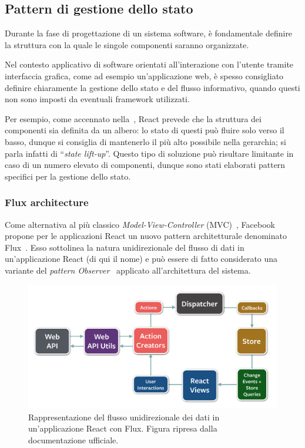 \subsection{Pattern di gestione dello stato}\label{subsec:state-manage}
Durante la fase di progettazione di un sistema software, è fondamentale definire la struttura con la quale le singole componenti saranno organizzate.

Nel contesto applicativo di software orientati all'interazione con l'utente tramite interfaccia grafica, come ad esempio un'applicazione web,
è spesso consigliato definire chiaramente la gestione dello stato e del flusso informativo, quando questi non sono imposti da eventuali framework utilizzati.

Per esempio, come accennato nella~, React prevede che la struttura dei componenti sia definita da un albero:
lo stato di questi può fluire solo verso il basso, dunque si consiglia di mantenerlo il più alto possibile nella gerarchia;
si parla infatti di ``\emph{state lift-up}''.
Questo tipo di soluzione può risultare limitante in caso di un numero elevato di componenti, dunque sono stati elaborati pattern specifici per la gestione dello stato.

\subsubsection{Flux architecture}
Come alternativa al più classico \emph{Model-View-Controller} (MVC)~\cite{Reenskaug2003TheM},
Facebook propone per le applicazioni React un nuovo pattern architetturale denominato Flux~\cite{10.1145/2742580.2742818}.
Esso sottolinea la natura unidirezionale del flusso di dati in un'applicazione React (di qui il nome)
e può essere di fatto considerato una variante del \emph{pattern Observer}~\cite{10.5555/186897} applicato all'architettura del sistema.

\begin{figure}[htbp]
  \centering
  \includegraphics[width=.9\textwidth]{res/fig/flux-diagram-white-background.png}
  \caption[
    Rappresentazione del flusso unidirezionale dei dati in un'applicazione React con Flux.
  ]{
    Rappresentazione del flusso unidirezionale dei dati in un'applicazione React con Flux.
    Figura ripresa dalla documentazione ufficiale.
  }%
  \label{fig:flux}
\end{figure}

